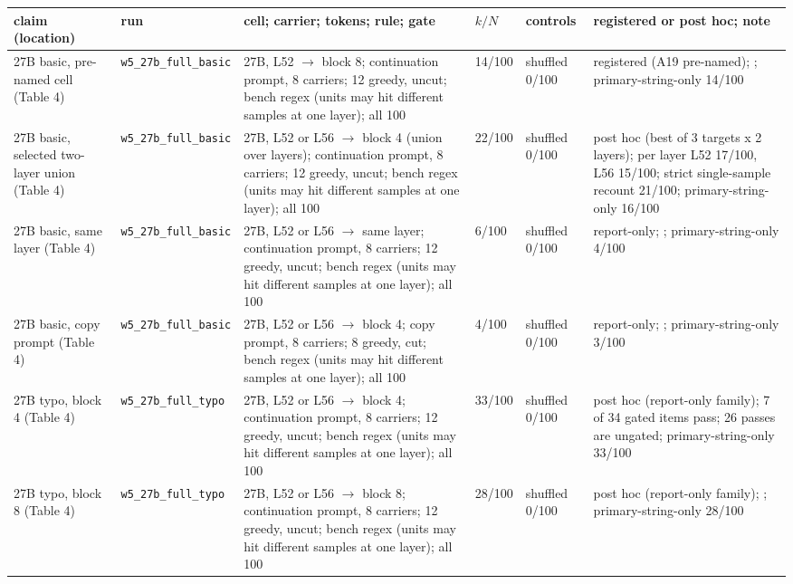 \begin{table}[t]
\centering
\small
\setlength{\tabcolsep}{1mm}
\begin{tabular}{@{}p{2.5cm}p{2.3cm}p{4.5cm}p{1.3cm}p{3.0cm}p{2.9cm}@{}}
\toprule
claim (location) & run & cell; carrier; tokens; rule; gate & $k/N$ & controls & registered or post hoc; note \\
\midrule
27B basic, pre-named cell (Table 4) & \texttt{w5\_\allowbreak{{}}27b\_\allowbreak{{}}full\_\allowbreak{{}}basic} & 27B, L52 $\to$ block 8; continuation prompt, 8 carriers; 12 greedy, uncut; bench regex (units may hit different samples at one layer); all 100 & 14/100 & shuffled 0/100 & registered (A19 pre-named); ; primary-string-only 14/100 \\
27B basic, selected two-layer union (Table 4) & \texttt{w5\_\allowbreak{{}}27b\_\allowbreak{{}}full\_\allowbreak{{}}basic} & 27B, L52 or L56 $\to$ block 4 (union over layers); continuation prompt, 8 carriers; 12 greedy, uncut; bench regex (units may hit different samples at one layer); all 100 & 22/100 & shuffled 0/100 & post hoc (best of 3 targets x 2 layers); per layer L52 17/100, L56 15/100; strict single-sample recount 21/100; primary-string-only 16/100 \\
27B basic, same layer (Table 4) & \texttt{w5\_\allowbreak{{}}27b\_\allowbreak{{}}full\_\allowbreak{{}}basic} & 27B, L52 or L56 $\to$ same layer; continuation prompt, 8 carriers; 12 greedy, uncut; bench regex (units may hit different samples at one layer); all 100 & 6/100 & shuffled 0/100 & report-only; ; primary-string-only 4/100 \\
27B basic, copy prompt (Table 4) & \texttt{w5\_\allowbreak{{}}27b\_\allowbreak{{}}full\_\allowbreak{{}}basic} & 27B, L52 or L56 $\to$ block 4; copy prompt, 8 carriers; 8 greedy, cut; bench regex (units may hit different samples at one layer); all 100 & 4/100 & shuffled 0/100 & report-only; ; primary-string-only 3/100 \\
27B typo, block 4 (Table 4) & \texttt{w5\_\allowbreak{{}}27b\_\allowbreak{{}}full\_\allowbreak{{}}typo} & 27B, L52 or L56 $\to$ block 4; continuation prompt, 8 carriers; 12 greedy, uncut; bench regex (units may hit different samples at one layer); all 100 & 33/100 & shuffled 0/100 & post hoc (report-only family); 7 of 34 gated items pass; 26 passes are ungated; primary-string-only 33/100 \\
27B typo, block 8 (Table 4) & \texttt{w5\_\allowbreak{{}}27b\_\allowbreak{{}}full\_\allowbreak{{}}typo} & 27B, L52 or L56 $\to$ block 8; continuation prompt, 8 carriers; 12 greedy, uncut; bench regex (units may hit different samples at one layer); all 100 & 28/100 & shuffled 0/100 & post hoc (report-only family); ; primary-string-only 28/100 \\

\end{tabular}
\end{table}

